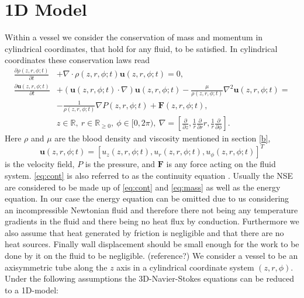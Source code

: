 \documentclass[a4paper, oneside]{discothesis}
\begin{document}
\section{1D Model} \label{sec:sv}
Within a vessel we consider the conservation of mass and momentum in cylindrical coordinates, that hold for any fluid, to be satisfied.
In cylindrical coordinates these conservation laws read
\begin{align}
	\frac{\partial \rho (z,r,\phi; t)}{\partial t} &+ \nabla \cdot \rho (z,r,\phi; t)\mathbf{u}(z,r,\phi; t) = 0, \label{eq:cont}\\
	\frac{\partial \mathbf{u}(z,r,\phi; t)}{\partial t} &+ \left( \mathbf{u}(z,r,\phi; t) \cdot \nabla \right) \mathbf{u}(z,r,\phi; t) - \frac{\mu}{\rho(z,r,\phi; t)} \nabla^2 \mathbf{u}(z,r,\phi; t) = \\
														&- \frac{1}{\rho (z,r,\phi; t)} \nabla P(z,r,\phi; t) + \mathbf{F}(z,r,\phi; t), \label{eq:mass} \\
														&z \in \mathbb{R}, \ r \in \mathbb{R}_{\geq 0}, \ \phi \in [0, 2\pi), \ \nabla = \left[\frac{\partial}{\partial z}, \frac{1}{r}\frac{\partial}{\partial r}r, \frac{1}{r}\frac{\partial}{\partial \phi}  \right].
\end{align}
Here $\rho$ and $\mu$ are the blood density and viscosity mentioned in section \ref{b}, 
\begin{equation}
	\mathbf{u}(z,r,\phi; t) = \left[ u_z(z,r,\phi; t), u_r(z,r,\phi; t), u_\phi (z,r,\phi; t) \right]^T
\end{equation}
is the velocity field, $P$ is the pressure, and $\mathbf{F}$ is any force acting on the fluid system.
\autoref{eq:cont} is also referred to as the continuity equation \cite{anderson2011ebook}.
Usually the NSE are considered to be made up of \autoref{eq:cont} and \autoref{eq:mass} as well as the energy equation.
In our case the energy equation can be omitted due to us considering an incompressible Newtonian fluid and therefore there not being any temperature gradients in the fluid and there being no heat flux by conduction.
Furthermore we also assume that heat generated by friction is negligible and that there are no heat sources.
Finally wall displacement should be small enough for the work to be done by it on the fluid to be negligible. (reference?)
We consider a vessel to be an axisymmetric tube along the $z$ axis in a cylindrical coordinate system $\left(z,r,\phi\right)$.
Under the following assumptions the 3D-Navier-Stokes equations can be reduced to a 1D-model:
\end{document}
